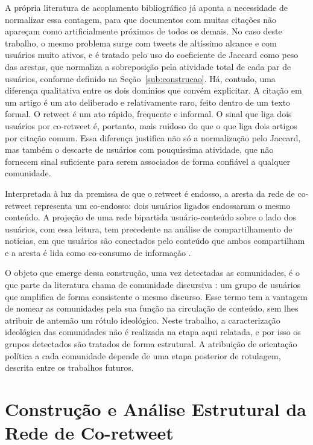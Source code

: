 \documentclass[conference]{IEEEtran}
\begin{document}
A própria literatura de acoplamento bibliográfico já aponta a necessidade de normalizar essa contagem, para que documentos com muitas citações não apareçam como artificialmente próximos de todos os demais. No caso deste trabalho, o mesmo problema surge com tweets de altíssimo alcance e com usuários muito ativos, e é tratado pelo uso do coeficiente de Jaccard como peso das arestas, que normaliza a sobreposição pela atividade total de cada par de usuários, conforme definido na Seção~\ref{sub:construcao}. Há, contudo, uma diferença qualitativa entre os dois domínios que convém explicitar. A citação em um artigo é um ato deliberado e relativamente raro, feito dentro de um texto formal. O retweet é um ato rápido, frequente e informal. O sinal que liga dois usuários por co-retweet é, portanto, mais ruidoso do que o que liga dois artigos por citação comum. Essa diferença justifica não só a normalização pelo Jaccard, mas também o descarte de usuários com pouquíssima atividade, que não fornecem sinal suficiente para serem associados de forma confiável a qualquer comunidade.

Interpretada à luz da premissa de que o retweet é endosso, a aresta da rede de co-retweet representa um co-endosso: dois usuários ligados endossaram o mesmo conteúdo. A projeção de uma rede bipartida usuário-conteúdo sobre o lado dos usuários, com essa leitura, tem precedente na análise de compartilhamento de notícias, em que usuários são conectados pelo conteúdo que ambos compartilham e a aresta é lida como co-consumo de informação \cite{b_cicchini2022}.

O objeto que emerge dessa construção, uma vez detectadas as comunidades, é o que parte da literatura chama de comunidade discursiva \cite{b_becatti2019}: um grupo de usuários que amplifica de forma consistente o mesmo discurso. Esse termo tem a vantagem de nomear as comunidades pela sua função na circulação de conteúdo, sem lhes atribuir de antemão um rótulo ideológico. Neste trabalho, a caracterização ideológica das comunidades não é realizada na etapa aqui relatada, e por isso os grupos detectados são tratados de forma estrutural. A atribuição de orientação política a cada comunidade depende de uma etapa posterior de rotulagem, descrita entre os trabalhos futuros.


\section{Construção e Análise Estrutural da Rede de Co-retweet}
\label{sec:contribuicao}
\end{document}
